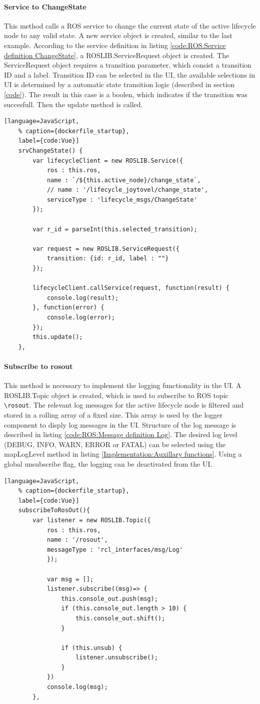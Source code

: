 \paragraph{Service to ChangeState} This method calls a ROS service to change the current state of the active lifecycle node to any valid state. A new service object is created, similar to the last example. According to the service definition in listing \ref{code:ROS:Service definition ChangeState}, a ROSLIB.ServiceRequest object is created. The ServiceRequest object requires a transition parameter, which consist a transition ID and a label. Transition ID can be selected in the UI, the available selections in UI is determined by a automatic state transition logic (described in section \ref{code}). The result in this case is a boolen, which indicates if the transition was succesfull. Then the update method is called.
\begin{lstlisting}[language=JavaScript,
	% caption={dockerfile_startup}, 
	label={code:Vue}]
	srvChangeState() {
		var lifecycleClient = new ROSLIB.Service({
			ros : this.ros,
			name : `/${this.active_node}/change_state`,
			// name : '/lifecycle_joytovel/change_state', 
			serviceType : 'lifecycle_msgs/ChangeState'
		});
	
		var r_id = parseInt(this.selected_transition);

		var request = new ROSLIB.ServiceRequest({
			transition: {id: r_id, label : ""}
		});

		lifecycleClient.callService(request, function(result) {
			console.log(result);
		}, function(error) {
			console.log(error);
		});
		this.update();
	},
\end{lstlisting}

\paragraph{Subscribe to rosout} This method is necessary to implement the logging functionality in the UI. A ROSLIB.Topic object is created, which is used to subscribe to ROS topic \lstinline{\rosout}. The relevant log messages for the active lifecycle node is filtered and stored in a rolling array of a fixed size. This array is used by the logger component to disply log messages in the UI. Structure of the log message is described in listing \ref{code:ROS:Message definition Log}. The desired log level (DEBUG, INFO, WARN, ERROR or FATAL) can be selected using the mapLogLevel method in listing \ref{Implementation:Auxillary functions}. Using a global unsubscribe flag, the logging can be deactivated from the UI. 
\begin{lstlisting}[language=JavaScript,
	% caption={dockerfile_startup}, 
	label={code:Vue}]
	subscribeToRosOut(){
		var listener = new ROSLIB.Topic({
			ros : this.ros,
			name : '/rosout',
			messageType : 'rcl_interfaces/msg/Log'
			});

			var msg = [];
			listener.subscribe((msg)=> {
				this.console_out.push(msg);
				if (this.console_out.length > 10) {
					this.console_out.shift();
				}
				
				if (this.unsub) {
					listener.unsubscribe();
				}
			}) 
			console.log(msg);
		},
\end{lstlisting}


